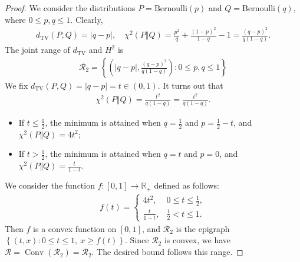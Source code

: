 \documentclass{article}
\numberwithin{equation}{section}
\newcommand{\bbR}{\mathbb{R}}
\renewcommand{\cal}{\mathcal}
\DeclareMathOperator{\conv}{Conv}
\theoremstyle{plain}
\theoremstyle{definition}
\begin{document}
\begin{proof}
We consider the distributions $P=\mathrm{Bernoulli}(p)$ and $Q=\mathrm{Bernoulli}(q)$, where $0\leq p,q\leq 1$. Clearly,
\begin{align*}
	d_\mathrm{TV}(P,Q)=\vert q-p\vert,\quad \chi^2(P\Vert Q)=\frac{p^2}{q}+\frac{(1-p)^2}{1-q}-1=\frac{(q-p)^2}{q(1-q)}.
\end{align*} 
The joint range of $d_{\mathrm{TV}}$ and $H^2$ is
\begin{align*}
	\cal{R}_2=\left\{\left(\vert q-p\vert,\frac{(q-p)^2}{q(1-q)}\right):0\leq p,q\leq 1\right\}
\end{align*}
We fix $d_\mathrm{TV}(P,Q)=\vert q-p\vert =t\in(0,1)$. It turns out that
\begin{align*}
	\chi^2(P\Vert Q)=\frac{t^2}{q(1-q)}=\frac{t^2}{q(1-q)}.
\end{align*}
\begin{itemize}
\item If $t\leq\frac{1}{2}$, the minimum is attained when $q=\frac{1}{2}$ and $p=\frac{1}{2}-t$, and $\chi^2(P\Vert Q)=4t^2$; 
\item If $t>\frac{1}{2}$, the minimum is attained when $q=t$ and $p=0$, and $\chi^2(P\Vert Q)=\frac{t}{1-t}$. 
\end{itemize}
We consider the function $f:[0,1]\to\bbR_+$ defined as follows:
\begin{align*}
	f(t)=\begin{cases}
		4t^2, &0\leq t\leq\frac{1}{2},\\
		\frac{t}{1-t}, &\frac{1}{2}<t\leq 1.
	\end{cases}
\end{align*}
Then $f$ is a convex function on $[0,1]$, and $\cal{R}_2$ is the epigraph $\left\{(t,x):0\leq t\leq 1,\ x\geq f(t)\right\}$. Since $\cal{R}_2$ is convex, we have $\cal{R}=\conv(\cal{R}_2)=\cal{R}_2$. The desired bound follows this range.
\end{proof}
\end{document}
